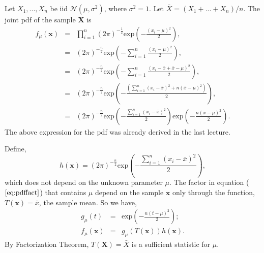\documentclass[a4paper,english,12pt]{article}
\newcommand{\bx}{\mathbf{x}}
\newcommand{\bX}{\mathbf{X}}
\begin{document}
\begin{exmp} 
 \label{ex:norml}
Let $X_1,...,X_n$ be iid $\mathcal{N}(\mu, \sigma^2)$, where $\sigma^2=1$. Let $\bar{X}=(X_1+...+X_n)/n$. The joint pdf of the sample $\bX$ is
\begin{eqnarray}
f_\mu(\bx) &=& \prod_{i=1}^{n}{(2\pi)^{-\frac{1}{2}} \text{exp}\left(-\frac{(x_i-\mu)^2}{2}\right)}, \nonumber \\
&=& (2\pi)^{-\frac{n}{2}}\text{exp}\left(-\sum_{i=1}^{n}{\frac{(x_i-\mu)^2}{2}}\right), \nonumber \\
&=& (2\pi)^{-\frac{n}{2}}\text{exp}\left(-\sum_{i=1}^{n}{\frac{(x_i-\bar{x}+\bar{x}-\mu)^2}{2}}\right), \nonumber \\
&=& (2\pi)^{-\frac{n}{2}}\text{exp}\left(-\frac{\left(\sum_{i=1}^{n}{(x_i-\bar{x})^2}+n(\bar{x}-\mu)^2\right)}{2}\right), \nonumber \\
&=& (2\pi)^{-\frac{n}{2}}\text{exp}\left(-\frac{\sum_{i=1}^{n}{(x_i-\bar{x})^2}}{2}\right)\text{exp}\left(-\frac{n(\bar{x}-\mu)^2}{2}\right). \label{eq:pdffact}
\end{eqnarray}
The above expression for the pdf was already derived in the last lecture. 
\par Define,
\begin{equation*}
h(\bx)=(2\pi)^{-\frac{n}{2}}\text{exp}\left(-\frac{\sum_{i=1}^{n}{(x_i-\bar{x})^2}}{2}\right),
\end{equation*}
which does not depend on the unknown parameter $\mu$. The factor in equation ($\ref{eq:pdffact}$) that contains $\mu$ depend on the sample $\bx$ only through the function, $T(\bx)=\bar{x}$, the sample mean. So we have, 
\begin{eqnarray}
g_\mu(t) &=& \text{exp}\left(-\frac{n(t-\mu)^2}{2}\right); \\
f_\mu(\bx)&=& g_\mu(T(\bx))h(\bx).
\end{eqnarray}
By Factorization Theorem, $T(\bX)=\bar{X}$ is a sufficient statistic for $\mu$.
\end{exmp}
\end{document}
